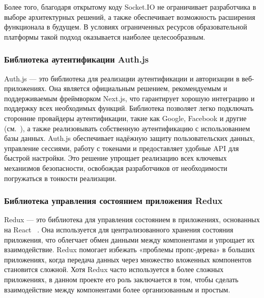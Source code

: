 Более того, благодаря открытому коду Socket.IO не ограничивает разработчика в выборе архитектурных решений, а также обеспечивает возможность расширения функционала в будущем. В условиях ограниченных ресурсов образовательной платформы такой подход оказывается наиболее целесообразным.

\subsubsection*{Библиотека аутентификации Auth.js}

Auth.js — это библиотека для реализации аутентификации и авторизации в веб-приложениях. Она является официальным решением, рекомендуемым и поддерживаемым фреймворком Next.js, что гарантирует хорошую интеграцию и поддержку всех необходимых функций. Библиотека позволяет легко подключать сторонние провайдеры аутентификации, такие как Google, Facebook и другие (см.~\cite{nextauth_docs}), а также реализовывать собственную аутентификацию с использованием базы данных. Auth.js обеспечивает надёжную защиту пользовательских данных, управление сессиями, работу с токенами и предоставляет удобные API для быстрой настройки. Это решение упрощает реализацию всех ключевых механизмов безопасности, освобождая разработчиков от необходимости погружаться в тонкости реализации.  

\subsubsection*{Библиотека управления состоянием приложения Redux}

Redux — это библиотека для управления состоянием в приложениях, основанных на React ~\cite{redux_docs}. Она используется для централизованного хранения состояния приложения, что облегчает обмен данными между компонентами и упрощает их взаимодействие. Redux помогает избежать «проблемы пропс-дерева» в больших приложениях, когда передача данных через множество вложенных компонентов становится сложной. Хотя Redux часто используется в более сложных приложениях, в данном проекте его роль заключается в том, чтобы сделать взаимодействие между компонентами более организованным и простым.

